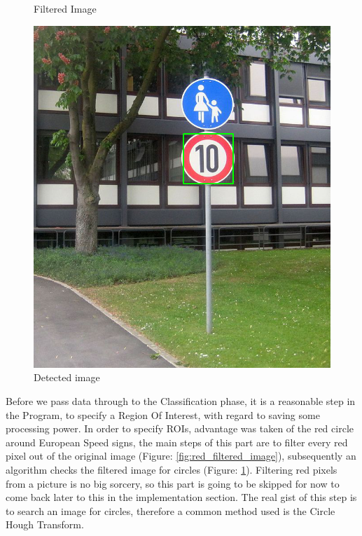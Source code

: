 \begin{figure}[H]
	\caption{Filtered Image}\label{fig:red_filtered_image}
	\endminipage\hfill
	\includegraphics[width=\linewidth]{images/detectedimg.png}
	\caption{Detected image}\label{fig:detected_image}
	\endminipage
\end{figure}


Before we pass data through to the Classification phase, it is a reasonable step in the Program, to specify a Region Of Interest, with regard to saving some processing power. In order to specify ROIs, advantage was taken of the red circle around European Speed signs, the main steps of this part are to filter every red pixel out of the original image (Figure: \ref{fig:red_filtered_image}), subsequently an algorithm checks the filtered image for circles (Figure: \ref{fig:detected_image}). Filtering red pixels from a picture is no big sorcery, so this part is going to be skipped for now to come back later to this in the implementation section. The real gist of this step is to search an image for circles, therefore a common method used is the Circle Hough Transform. 

